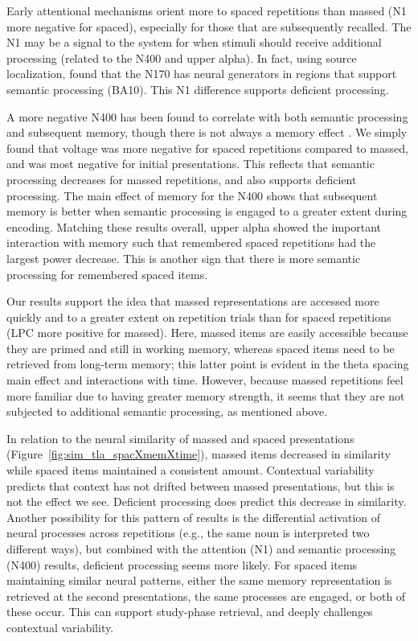 Early attentional mechanisms orient more to spaced repetitions than massed (N1 more negative for spaced), especially for those that are subsequently recalled.  The N1 may be a signal to the system for when stimuli should receive additional processing (related to the N400 and upper alpha).  In fact, using source localization,  found that the N170 has neural generators in regions that support semantic processing (BA10).  This N1 difference supports deficient processing.


A more negative N400 has been found to correlate with both semantic processing and subsequent memory, though there is not always a memory effect \cite<reviewed in>{FrieJohn2000}.  We simply found that voltage was more negative for spaced repetitions compared to massed, and was most negative for initial presentations.  This reflects that semantic processing decreases for massed repetitions, and also supports deficient processing.  The main effect of memory for the N400 shows that subsequent memory is better when semantic processing is engaged to a greater extent during encoding.  Matching these results overall, upper alpha showed the important interaction with memory such that remembered spaced repetitions had the largest power decrease.  This is another sign that there is more semantic processing for remembered spaced items.

Our results support the idea that massed representations are accessed more quickly and to a greater extent on repetition trials than for spaced repetitions (LPC more positive for massed).  Here, massed items are easily accessible because they are primed and still in working memory, whereas spaced items need to be retrieved from long-term memory; this latter point is evident in the theta spacing main effect and interactions with time.  However, because massed repetitions feel more familiar due to having greater memory strength, it seems that they are not subjected to additional semantic processing, as mentioned above.

\cbstart
In relation to the neural similarity of massed and spaced presentations (Figure~\ref{fig:sim_tla_spacXmemXtime}), massed items decreased in similarity while spaced items maintained a consistent amount.  Contextual variability predicts that context has not drifted between massed presentations, but this is not the effect we see.  Deficient processing does predict this decrease in similarity.  Another possibility for this pattern of results is the differential activation of neural processes across repetitions (e.g., the same noun is interpreted two different ways), but combined with the attention (N1) and semantic processing (N400) results, deficient processing seems more likely.  For spaced items maintaining similar neural patterns, either the same memory representation is retrieved at the second presentations, the same processes are engaged, or both of these occur.  This can support study-phase retrieval, and deeply challenges contextual variability.
\cbend


